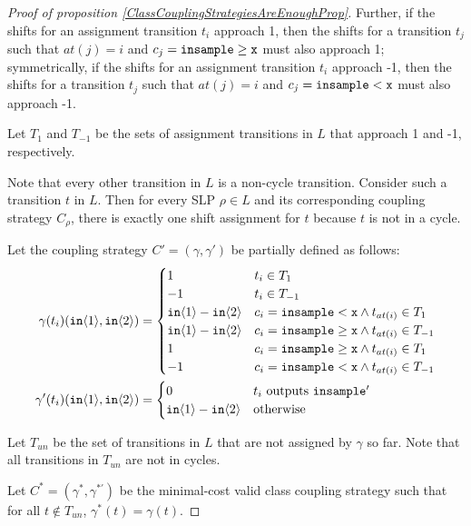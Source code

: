 \begin{proof}[Proof of proposition \ref{ClassCouplingStrategiesAreEnoughProp}]
    Further, if the shifts for an assignment transition $t_i$ approach 1, then the shifts for a transition $t_j$ such that $at(j) = i$ and $c_j = \gguard[\texttt{x}]$ must also approach 1; symmetrically, if the shifts for an assignment transition $t_i$ approach -1, then the shifts for a transition $t_j$ such that $at(j) = i$ and $c_j = \lguard[\texttt{x}]$ must also approach -1. 

    Let $T_1$ and $T_{-1}$ be the sets of assignment transitions in $L$ that approach 1 and -1, respectively. 

    Note that every other transition in $L$ is a non-cycle transition. Consider such a transition $t$ in $L$. Then for every SLP $\rho\in L$ and its corresponding coupling strategy $C_\rho$, there is exactly one shift assignment for $t$ because $t$ is not in a cycle. 

    Let the coupling strategy $C' = (\gamma, \gamma')$ be partially defined as follows: \begin{align*}
        \gamma(t_i)(\texttt{in}\brangle{1}, \texttt{in}\brangle{2}) &= \begin{cases}
            1 & t_i \in T_1\\
            -1 & t_i \in T_{-1}\\
            \texttt{in}\brangle{1}-\texttt{in}\brangle{2} & c_i = \lguard[\texttt{x}]\land t_{at(i)}\in T_1\\
            \texttt{in}\brangle{1}-\texttt{in}\brangle{2} & c_i = \gguard[\texttt{x}]\land t_{at(i)}\in T_{-1}\\
            1 & c_i = \gguard[\texttt{x}]\land t_{at(i)}\in T_1\\
            -1 & c_i = \lguard[\texttt{x}]\land t_{at(i)}\in T_{-1}
        \end{cases}\\
        \gamma'(t_i)(\texttt{in}\brangle{1}, \texttt{in}\brangle{2}) &=\begin{cases}
            0 & t_i\text{ outputs }\texttt{insample}'\\
            \texttt{in}\brangle{1}-\texttt{in}\brangle{2} & \text{otherwise}
        \end{cases}
    \end{align*}

    Let $T_{un}$ be the set of transitions in $L$ that are not assigned by $\gamma$ so far. Note that all transitions in $T_{un}$ are not in cycles. 

    Let $C^* = (\gamma^*, \gamma^{*\prime})$ be the minimal-cost valid class coupling strategy such that for all $t\notin T_{un}$, $\gamma^*(t) = \gamma(t)$. 


\end{proof}
